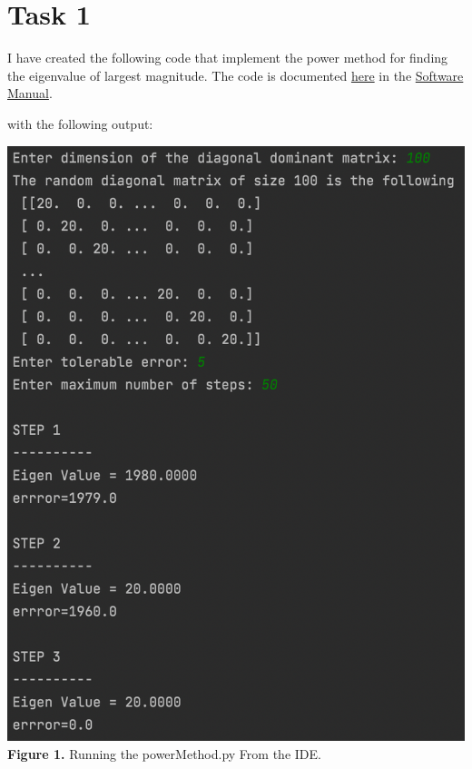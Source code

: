 \documentclass{article}
\begin{document}
\section*{Task 1}
I have created the following code that implement the power method for finding the eigenvalue of largest magnitude. The code is documented \href{https://github.com/GoByMark/math4610/blob/main/Homework_Tasks/Tasksheet_10/src/powerMethod.py}{here} in the \href{https://github.com/GoByMark/math4610/blob/main/Homework_Tasks/Software_Manual/Software_Manual_toc.md}{Software Manual}.


\newpage

with the following output:
\begin{center}
\includegraphics[width=\textwidth]{Screenshots/1.png}\\
{\bf Figure 1.} Running the powerMethod.py From the IDE.
\end{center}

\newpage
\end{document}
